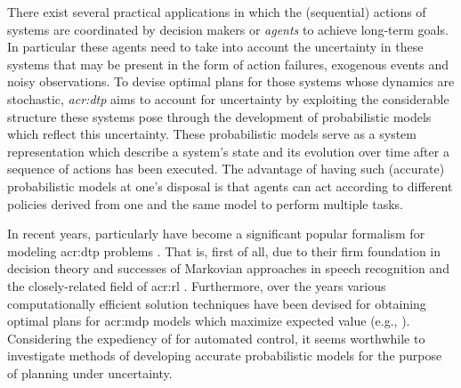 There exist several practical applications in which the (sequential) actions of systems are coordinated by decision makers or \textit{agents} to achieve long-term goals.
In particular these agents need to take into account the uncertainty in these systems that may be present in the form of action failures, exogenous events and noisy observations.
To devise optimal plans for those systems whose dynamics are stochastic, \textit{\acrfull{acr:dtp}} aims to account for uncertainty by exploiting the considerable structure these systems pose through the development of probabilistic models which reflect this uncertainty.
These probabilistic models serve as a system representation which describe a system's state and its evolution over time after a sequence of actions has been executed.
The advantage of having such (accurate) probabilistic models at one's disposal is that agents can act according to different policies derived from one and the same model to perform multiple tasks.

In recent years, particularly \textit{} have become a significant popular formalism for modeling \acrshort{acr:dtp} problems \cite{Boutilier1999}. 
That is, first of all, due to their firm foundation in decision theory and successes of Markovian approaches in speech recognition \cite{baker1992large, gales2008application, rabiner1989tutorial} and the closely-related field of \acrfull{acr:rl} \cite{kaelbling1996reinforcement, Brafman2002}.
Furthermore, over the years various computationally efficient solution techniques have been devised for obtaining optimal plans for \acrshort{acr:mdp} models which maximize expected value (e.g.,  \cite{puterman2014markov, howard1960dynamic}).
Considering the expediency of  for automated control, it seems worthwhile to investigate methods of developing accurate probabilistic models for the purpose of planning under uncertainty.



